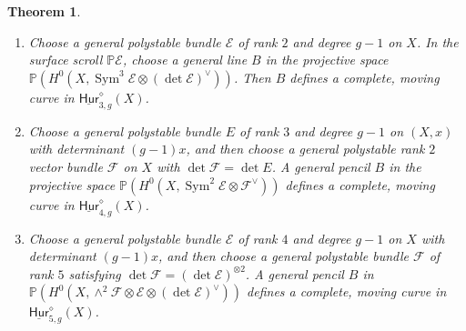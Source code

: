 \documentclass[reqno, 11pt]{amsart}
\newtheorem{theorem}{Theorem}[section]
\renewcommand{\P}{\mathbb{P}}
\DeclareMathOperator{\Sym}{Sym}
\newcommand{\Hurfixedstable}[2]{\underline{\mathsf{Hur}}_{#1,#2}^{\diamond}}
\begin{document}
\begin{theorem}
    \label{theorem:trigonal} 
\begin{enumerate}
    \item Choose a general polystable bundle $\mathcal{E}$ of rank $2$ and degree $g-1$ on $X$. In the surface scroll $\P \mathcal{E}$, choose a general line $B$ in the projective space $\P (H^{0}(X, \Sym^{3} \mathcal{E} \otimes (\det \mathcal{E})^{\vee}))$.  Then $B$ defines a complete, moving curve in $\Hurfixedstable{3}{g}(X)$.
     \item Choose a general polystable bundle $E$ of rank $3$ and degree $g-1$ on $(X,x)$ with determinant $(g-1)x$, and then choose a general polystable rank $2$ vector bundle $\mathcal{F}$ on $X$ with $\det \mathcal{F} = \det E$. A general pencil $B$ in the projective space $\P (H^{0}(X, \Sym^{2}\mathcal{E} \otimes \mathcal{F}^{\vee}))$ defines a complete, moving curve in $\Hurfixedstable{4}{g}(X)$.
     \item Choose a general polystable bundle $\mathcal{E}$ of rank $4$ and degree $g-1$ on $X$ with determinant $(g-1)x$, and then choose a general polystable bundle $\mathcal{F}$ of rank $5$ satisfying $\det \mathcal{F} = (\det \mathcal{E})^{\otimes 2}$. A general pencil $B$ in  $\P (H^{0}(X, \wedge^{2} \mathcal{F} \otimes \mathcal{E} \otimes (\det \mathcal{E})^{\vee}))$ defines a complete, moving curve in $\Hurfixedstable{5}{g}(X)$.
\end{enumerate}
\end{theorem}
\end{document}
